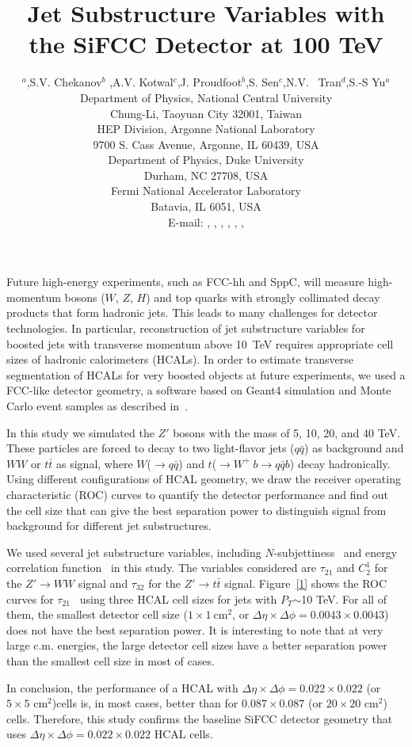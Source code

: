 \documentclass[a4paper]{PoS}
\title{Jet Substructure Variables with the SiFCC Detector at 100 TeV}
\author{\speaker{C.-H Yeh}$^a$,S.V. Chekanov$^b$ ,A.V. Kotwal$^{c}$,J. Proudfoot$^{b}$,S. Sen$^{c}$,N.V. ~Tran$^{d}$,S.-S Yu$^{a}$\\     
     \llap{$^a$}Department of Physics, National Central University\\
     Chung-Li, Taoyuan City 32001, Taiwan\\
     \llap{$^b$}HEP Division, Argonne National Laboratory\\
     9700 S. Cass Avenue, Argonne, IL 60439, USA\\
     \llap{$^c$}Department of Physics, Duke University\\
     Durham, NC 27708, USA\\
     \llap{$^d$}Fermi National Accelerator Laboratory\\
     Batavia, IL 6051, USA\\
     E-mail:  \email{a9510130375@gmail.com},
     \email{chekanov@anl.gov},
     \email{kotwal@phy.duke.edu},
     \email{proudfoot@anl.gov},
     \email{sourav.sen@duke.edu},
     \email{ntran@fnal.gov},
     \email{syu@phy.ncu.edu.tw}}
\begin{document}
Future high-energy experiments, such as FCC-hh and SppC, 
will measure high-momentum bosons ($W$, $Z$, $H$) and top quarks 
with strongly collimated decay products that form hadronic jets. This leads to many
challenges for detector technologies.  In particular, reconstruction of jet substructure  variables for boosted jets with transverse
momentum above 10~TeV
requires appropriate  cell sizes of hadronic
calorimeters  (HCALs). In order to estimate 
transverse segmentation  
of HCALs for very boosted objects at future experiments, 
we used a FCC-like detector geometry,
a software based on Geant4 simulation and Monte Carlo event samples as described in~\cite{Chekanov:2016ppq}.
 
In this study we simulated the $Z'$ bosons with the mass of 5, 10, 20, and 40 TeV. These particles are forced to decay to two light-flavor jets ($q\bar{q}$) as background and $W W$ or $t\bar{t}$ as signal, where $W$($\rightarrow q\bar{q}$) and $t$($ \rightarrow  W^+\>b \rightarrow q\bar{q} b$) decay hadronically. Using different configurations of HCAL geometry, we draw the receiver operating characteristic (ROC) curves to quantify the detector performance and find out the cell size that can give the best separation power to distinguish signal from background for different jet substructures.

We used several jet substructure variables, including $N$-subjettiness~\cite{Thaler:2010tr} and energy correlation function~\cite{Larkoski:2013eya} in this study. The variables considered are $\tau_{21}$ and $C_2^1$ for the $Z'\rightarrow WW$ signal and $\tau_{32}$ for the $Z' \rightarrow t\bar{t}$ signal. Figure~\ref{1} shows the ROC curves for $\tau_{21}$~\cite{Thaler:2010tr} using three HCAL cell sizes for jets with $P_{T}$$\sim$10 TeV. For all of them, the smallest detector cell size ($1\times1~\mathrm{cm}^2$, or $\Delta \eta \times \Delta \phi = 0.0043\times0.0043$) does not have the best separation power. It is interesting to note that at very large c.m. energies, the large detector cell sizes have a better separation power than the smallest cell size in most of cases. 

In conclusion, the  performance 
of a  HCAL with 
$\Delta \eta \times \Delta \phi = 0.022\times0.022$ (or $5\times5$ cm$^2$)cells is, in most cases,
better than for $0.087\times0.087$ (or $20\times20$ cm$^2$) cells.
Therefore, this study confirms the  baseline SiFCC detector geometry \cite{Chekanov:2016ppq}
that uses $\Delta \eta \times \Delta \phi = 0.022\times0.022$ HCAL cells.
\end{document}
